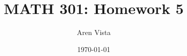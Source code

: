 
\title{ MATH 301: Homework 5}
\author{ Aren Vista }
\date{\today}
 \maketitle





















